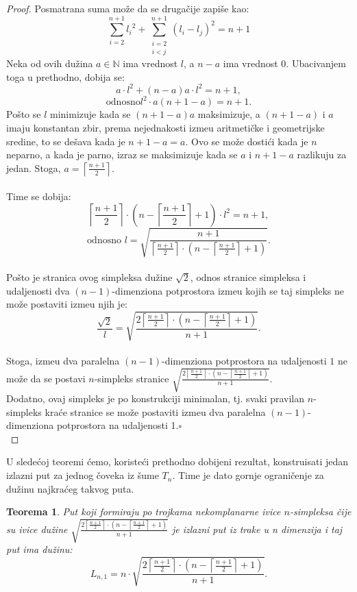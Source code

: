 \documentclass[11pt,letter]{article}
\newtheorem{teo}{\bf Teorema}[section]
\newcommand{\qed}{\hfill $\square$ \bigskip}
\begin{document}
\begin{proof}
\indent Posmatrana suma mo\v ze da se druga\v cije zapi\v se kao:
$$\sum^{n+1}_{i=2}{l_i}^2+\sum^{n+1}_{\substack{i=2\\ i<j}}(l_i-l_j)^2=n+1$$
\indent Neka od ovih du\v zina $a\in \mathbb{N}$ ima vrednost $l$, a $n-a$ ima vrednost 0. Ubacivanjem toga u prethodno, dobija se:
$$a\cdot l^2+(n-a)a\cdot l^2=n+1,$$
$$\text{odnosno} l^2\cdot a(n+1-a)=n+1.$$
\indent Po\v sto se $l$ minimizuje kada se $(n+1-a)a$ maksimizuje, a $(n+1-a)$ i $a$ imaju konstantan zbir, prema nejednakosti izme\dj u aritmeti\v cke i geometrijske sredine, to se de\v sava kada je $n+1-a=a$. Ovo se mo\v ze dosti\' ci kada je $n$ neparno, a kada je parno, izraz se maksimizuje kada se $a$ i $n+1-a$ razlikuju za jedan. Stoga, $a= \left \lceil{\frac{n+1}{2}}\right \rceil$.
\\
\\
\indent Time se dobija:
$$\left \lceil \frac{n+1}{2} \right \rceil \cdot \left( n-\left \lceil \frac{n+1}{2}\right \rceil +1\right)\cdot l^2=n+1,$$
$$\text{odnosno } l=\sqrt{\frac{n+1}{\left\lceil \frac{n+1}{2}\right\rceil \cdot \left( n-\left\lceil \frac{n+1}{2}\right\rceil+1\right)}}.$$
\\
\indent Po\v sto je stranica ovog simpleksa du\v zine $\sqrt2$, odnos stranice simpleksa i udaljenosti dva $(n-1)$-dimenziona potprostora izme\dj u  kojih se taj simpleks ne mo\v ze postaviti izme\dj u njih je:
$$\frac{\sqrt2}{l}=\sqrt{\frac{2\left\lceil \frac{n+1}{2}\right\rceil\cdot \left( n-\left\lceil\frac{n+1}{2}\right\rceil+1\right)}{n+1}}.$$
\\
\indent Stoga, izme\dj u dva paralelna $(n-1)$-dimenziona potprostora na udaljenosti $1$ ne mo\v ze da se postavi $n$-simpleks stranice  $\sqrt{\frac{2\left\lceil \frac{n+1}{2}\right\rceil\cdot \left( n-\left\lceil\frac{n+1}{2}\right\rceil+1\right)}{n+1}}$.
\\
\indent Dodatno, ovaj simpleks je po konstrukciji minimalan, tj. svaki pravilan $n$-simpleks kra\' ce stranice se mo\v ze postaviti izme\dj u dva paralelna $(n-1)$-dimenziona potprostora na udaljenosti 1.\qed
\\
\end{proof}

\indent U slede\' coj teoremi \' cemo, koriste\' ci prethodno dobijeni rezultat, konstruisati jedan izlazni put za jednog \v coveka iz \v sume $T_n$. Time je dato gornje ograni\v cenje za du\v zinu najkra\' ceg takvog puta.
\bigskip
\begin{teo} Put koji formiraju po trojkama nekomplanarne ivice $n$-simpleksa \v cije su ivice du\v zine $\sqrt{\frac{2\left\lceil \frac{n+1}{2}\right\rceil\cdot \left( n-\left\lceil\frac{n+1}{2}\right\rceil+1\right)}{n+1}}$ je izlazni put iz trake u n dimenzija i taj put ima du\v zinu:
$$L_{n,1}=n\cdot \sqrt{\frac{2\left\lceil \frac{n+1}{2}\right\rceil\cdot \left( n-\left\lceil\frac{n+1}{2}\right\rceil+1\right)}{n+1}}.$$\end{teo}
\smallskip
\end{document}
